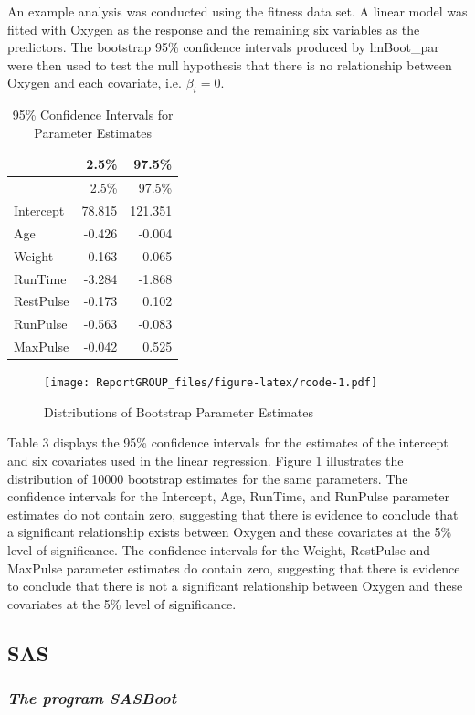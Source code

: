 \documentclass[]{article}
\begin{document}
An example analysis was conducted using the fitness data set. A linear
model was fitted with Oxygen as the response and the remaining six
variables as the predictors. The bootstrap 95\% confidence intervals
produced by lmBoot\_par were then used to test the null hypothesis that
there is no relationship between Oxygen and each covariate, i.e.
\(\beta_i = 0\).

\begin{longtable}[]{@{}lrr@{}}
\caption{95\% Confidence Intervals for Parameter
Estimates}\tabularnewline
\toprule
& 2.5\% & 97.5\%\tabularnewline
\midrule
\endfirsthead
\toprule
& 2.5\% & 97.5\%\tabularnewline
\midrule
\endhead
Intercept & 78.815 & 121.351\tabularnewline
Age & -0.426 & -0.004\tabularnewline
Weight & -0.163 & 0.065\tabularnewline
RunTime & -3.284 & -1.868\tabularnewline
RestPulse & -0.173 & 0.102\tabularnewline
RunPulse & -0.563 & -0.083\tabularnewline
MaxPulse & -0.042 & 0.525\tabularnewline
\bottomrule
\end{longtable}

\begin{figure}
\centering
\texttt{[image: ReportGROUP\_files/figure-latex/rcode-1.pdf]}
\caption{\label{fig:rcode} Distributions of Bootstrap Parameter
Estimates}
\end{figure}

Table 3 displays the 95\% confidence intervals for the estimates of the
intercept and six covariates used in the linear regression. Figure 1
illustrates the distribution of 10000 bootstrap estimates for the same
parameters. The confidence intervals for the Intercept, Age, RunTime,
and RunPulse parameter estimates do not contain zero, suggesting that
there is evidence to conclude that a significant relationship exists
between Oxygen and these covariates at the 5\% level of significance.
The confidence intervals for the Weight, RestPulse and MaxPulse
parameter estimates do contain zero, suggesting that there is evidence
to conclude that there is not a significant relationship between Oxygen
and these covariates at the 5\% level of significance.

\pagebreak 

\subsection{SAS}\label{sas}

\subsubsection{\texorpdfstring{\emph{The program
SASBoot}}{The program SASBoot}}\label{the-program-sasboot}
\end{document}
